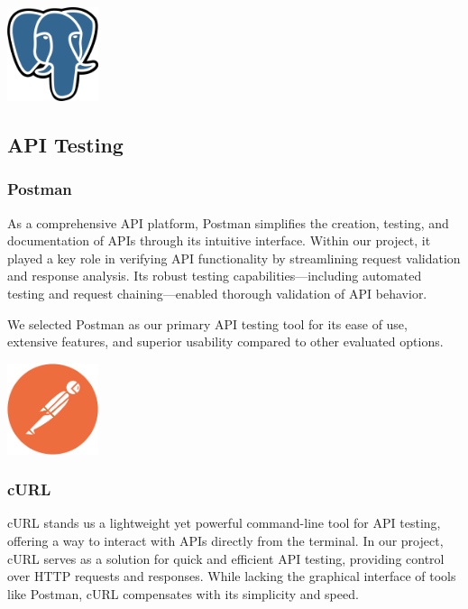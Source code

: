 \begin{center}
    \centering
    \includegraphics[width=0.2\textwidth]{Images/PostgreSQL Logo.png}
     \cite{postgresql_logo}
    \label{fig:postgresql_logo}
\end{center}

\subsection{API Testing}

\subsubsection{Postman}
As a comprehensive API platform, Postman simplifies the creation, testing, and documentation of APIs through its intuitive interface. Within our project, it played a key role in verifying API functionality by streamlining request validation and response analysis. Its robust testing capabilities—including automated testing and request chaining—enabled thorough validation of API behavior.\mynewline

We selected Postman as our primary API testing tool for its ease of use, extensive features, and superior usability compared to other evaluated options.

\begin{center}
    \centering
    \includegraphics[width=0.2\textwidth]{Images/Postman Logo.png}
     \cite{postman_logo}
    \label{fig:postman_logo}
\end{center}

\subsubsection{cURL}
cURL stands us a lightweight yet powerful command-line tool for API testing, offering a way to interact with APIs directly from the terminal. In our project, cURL serves as a solution for quick and efficient API testing, providing control over HTTP requests and responses. While lacking the graphical interface of tools like Postman, cURL compensates with its simplicity and speed.\mynewline

